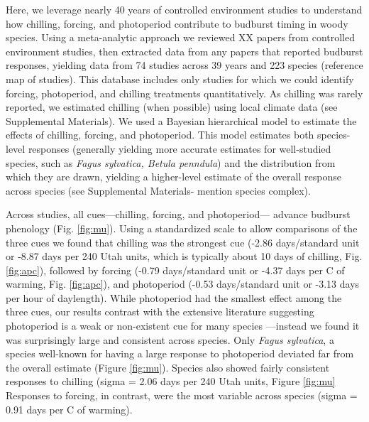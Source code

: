 \documentclass{article}
\begin{document}
\par Here, we leverage nearly 40 years of controlled environment studies to understand how chilling, forcing, and photoperiod contribute to budburst timing in woody species. Using a meta-analytic approach we reviewed XX papers from controlled environment studies, then extracted data from any papers that reported budburst responses, yielding data from 74 studies across 39 years and 223 species (reference map of studies).  This database includes only studies for which we could identify forcing, photoperiod, and chilling treatments quantitatively. As chilling was rarely reported, we estimated chilling (when possible) using local climate data (see Supplemental Materials). We used a Bayesian hierarchical model to estimate the effects of chilling, forcing, and photoperiod. This model estimates both species-level responses (generally yielding more accurate estimates for well-studied species, such as \emph{Fagus sylvatica, Betula penndula}) and the distribution from which they are drawn, yielding a higher-level estimate of the overall response across species (see Supplemental Materials- mention species complex).\\ %


\par Across studies, all cues---chilling, forcing, and photoperiod--- advance budburst phenology (Fig. \ref {fig:mu}). Using a standardized scale to allow comparisons of the three cues we found that chilling was the strongest cue (-2.86 days/standard unit or -8.87 days per 240 Utah units, which is typically about 10 days of chilling, Fig. \ref {fig:apc}), followed by forcing (-0.79 days/standard unit or -4.37 days per \degree C of warming, Fig. \ref {fig:apc}), and photoperiod (-0.53 days/standard unit or -3.13 days per hour of daylength). While photoperiod had the smallest effect among the three cues, our results contrast with the extensive literature suggesting photoperiod is a weak or non-existent cue for many species \citep{zohner2016,koerner2010a}---instead we found it was surprisingly large and consistent across species. Only \emph{Fagus sylvatica}, a species well-known for having a large response to photoperiod deviated far from the overall estimate (Figure \ref {fig:mu}). Species also showed fairly consistent responses to chilling (sigma = 2.06 days per 240 Utah units, Figure \ref {fig:mu}%
Responses to forcing, in contrast, were the most variable across species (sigma = 0.91 days per \degree C of warming).
\end{document}
